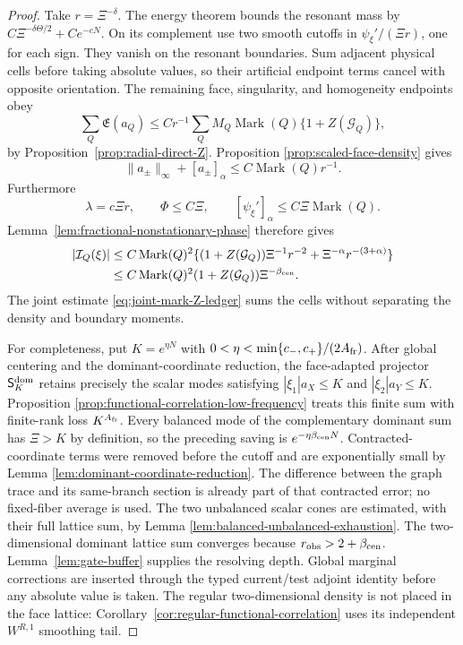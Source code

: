 \documentclass[11pt]{article}
\begin{document}
\begin{proof}
Take \(r=\Xi^{-\delta}\).  The energy theorem bounds the resonant mass by
\(C\Xi^{-\delta\Theta/2}+Ce^{-cN}\).  On its complement use two smooth
cutoffs in
\(\psi_\xi'/(\Xi r)\), one for each sign.  They vanish on the resonant
boundaries.  Sum adjacent physical cells before taking absolute values, so
their artificial endpoint terms cancel with opposite orientation.  The
remaining face, singularity, and homogeneity endpoints obey
\begin{equation}
\label{eq:phase-endpoint-ledger}
 \sum_Q\mathfrak E(a_Q)
 \le Cr^{-1}\sum_QM_Q\operatorname{Mark}(Q)
       \{1+Z(\mathcal G_Q)\},
\end{equation}
by Proposition~\ref{prop:radial-direct-Z}.  Proposition
\ref{prop:scaled-face-density} gives
\[
 \|a_\pm\|_\infty+[a_\pm]_\alpha
 \le C\operatorname{Mark}(Q) r^{-1}.
\]
Furthermore
\[
 \lambda=c\Xi r,\qquad
 \Phi\le C\Xi,\qquad
 [\psi_\xi']_\alpha\le C\Xi\operatorname{Mark}(Q).
\]
Lemma~\ref{lem:fractional-nonstationary-phase} therefore gives
\begin{align*}
 |\mathcal I_Q(\xi)|
 &\le C\operatorname{Mark}(Q)^2
 \{(1+Z(\mathcal G_Q))\Xi^{-1}r^{-2}
        +\Xi^{-\alpha}r^{-(3+\alpha)}\}\\
 &\le C\operatorname{Mark}(Q)^2(1+Z(\mathcal G_Q))
       \Xi^{-\beta_{\rm cen}}.
\end{align*}
The joint estimate \eqref{eq:joint-mark-Z-ledger} sums the cells without
separating the density and boundary moments.

For completeness, put $K=e^{\eta N}$ with
$0<\eta<\min\{c_-,c_+\}/(2A_{\rm fr})$.  After global centering and the
dominant-coordinate reduction, the face-adapted projector
$\mathsf S_K^{\rm dom}$ retains precisely the scalar modes satisfying
$|\xi_1|a_X\le K$ and $|\xi_2|a_Y\le K$.  Proposition
\ref{prop:functional-correlation-low-frequency} treats this finite sum with
finite-rank loss $K^{A_{\rm fr}}$.  Every balanced mode of the complementary dominant
sum has $\Xi>K$ by definition, so the preceding saving is
$e^{-\eta\beta_{\rm cen}N}$.  Contracted-coordinate terms were removed before
the cutoff and are exponentially small by Lemma
\ref{lem:dominant-coordinate-reduction}.  The difference between the graph
trace and its same-branch section is already part of that contracted error;
no fixed-fiber average is used.  The two unbalanced scalar cones are
estimated, with their full lattice sum, by Lemma
\ref{lem:balanced-unbalanced-exhaustion}.  The two-dimensional dominant lattice sum converges because
\(r_{\rm obs}>2+\beta_{\rm cen}\).  Lemma~\ref{lem:gate-buffer} supplies the
resolving depth.  Global marginal corrections are inserted through the typed
current/test adjoint identity before any absolute value is taken.  The
regular two-dimensional density is not placed in the face lattice:
Corollary~\ref{cor:regular-functional-correlation} uses its independent
$W^{R,1}$ smoothing tail.
\end{proof}
\end{document}
